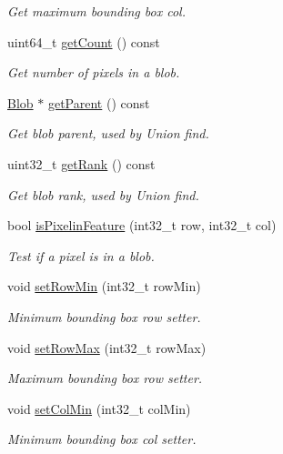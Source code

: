 \begin{DoxyCompactItemize}
\begin{DoxyCompactList}\small\item\em Get maximum bounding box col. \end{DoxyCompactList}\item 
uint64\+\_\+t \hyperlink{classfc_1_1Blob_a7443f8362ad88c61e5dcfae2dad54d47}{get\+Count} () const
\begin{DoxyCompactList}\small\item\em Get number of pixels in a blob. \end{DoxyCompactList}\item 
\hyperlink{classfc_1_1Blob}{Blob} $\ast$ \hyperlink{classfc_1_1Blob_afde20e8b149cc08b56bac810177c4836}{get\+Parent} () const
\begin{DoxyCompactList}\small\item\em Get blob parent, used by Union find. \end{DoxyCompactList}\item 
uint32\+\_\+t \hyperlink{classfc_1_1Blob_a368c9607fb6d7e032795d742eaed1539}{get\+Rank} () const
\begin{DoxyCompactList}\small\item\em Get blob rank, used by Union find. \end{DoxyCompactList}\item 
bool \hyperlink{classfc_1_1Blob_a462ba30be4256cccc0270ab0d278bb07}{is\+Pixelin\+Feature} (int32\+\_\+t row, int32\+\_\+t col)
\begin{DoxyCompactList}\small\item\em Test if a pixel is in a blob. \end{DoxyCompactList}\item 
void \hyperlink{classfc_1_1Blob_a14a42d0f0fe5a8c06444609027faecbe}{set\+Row\+Min} (int32\+\_\+t row\+Min)
\begin{DoxyCompactList}\small\item\em Minimum bounding box row setter. \end{DoxyCompactList}\item 
void \hyperlink{classfc_1_1Blob_af726d6434723c76d5c9e793a99a01408}{set\+Row\+Max} (int32\+\_\+t row\+Max)
\begin{DoxyCompactList}\small\item\em Maximum bounding box row setter. \end{DoxyCompactList}\item 
void \hyperlink{classfc_1_1Blob_aa9972e1dd32aa399426b87bc4c610d69}{set\+Col\+Min} (int32\+\_\+t col\+Min)
\begin{DoxyCompactList}\small\item\em Minimum bounding box col setter. \end{DoxyCompactList}\item 

\end{DoxyCompactItemize}
